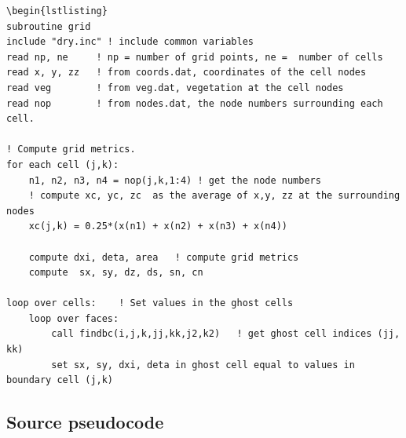 \documentclass{article}
\begin{document}
\begin{lstlisting}
\begin{lstlisting}
subroutine grid
include "dry.inc" ! include common variables 
read np, ne 	! np = number of grid points, ne =  number of cells
read x, y, zz	! from coords.dat, coordinates of the cell nodes
read veg        ! from veg.dat, vegetation at the cell nodes	
read nop		! from nodes.dat, the node numbers surrounding each cell.

! Compute grid metrics.
for each cell (j,k):
	n1, n2, n3, n4 = nop(j,k,1:4) ! get the node numbers
	! compute xc, yc, zc  as the average of x,y, zz at the surrounding nodes
	xc(j,k) = 0.25*(x(n1) + x(n2) + x(n3) + x(n4))  

	compute dxi, deta, area   ! compute grid metrics
	compute  sx, sy, dz, ds, sn, cn			
	
loop over cells:	! Set values in the ghost cells
	loop over faces:	
		call findbc(i,j,k,jj,kk,j2,k2)   ! get ghost cell indices (jj, kk)
		set sx, sy, dxi, deta in ghost cell equal to values in boundary cell (j,k)
\end{lstlisting}

\subsection{Source pseudocode }
\end{document}
